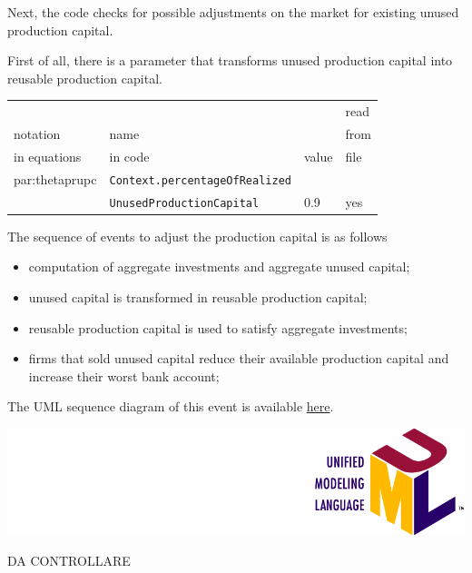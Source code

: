 \documentclass{book}
\newcommand{\doclocation}{file:///Users/giulioni/Documents/workspace/gabriele/docs}
\begin{document}

\vskip3mm
Next, the code checks for possible adjustments on the market for existing unused production capital.

First of all, there is a parameter that transforms unused production capital into reusable production capital.

\vskip3mm
\noindent
\begin{tabular}{l l l l}
	\hline
	& &&read\\
	notation& name &&from\\
	in equations& in code&value&file\\
	\hline
	\hline
	\gls{par:thetaprupc}&\verb+Context.percentageOfRealized+&&\\
	&\hskip2cm \verb+UnusedProductionCapital+&0.9&yes\\
	\hline
\end{tabular}

\vskip3mm

The sequence of events to adjust the production capital is as follows
\begin{itemize}
	\item computation of aggregate investments and aggregate unused capital;
	\item unused capital is transformed in reusable production capital;
	\item reusable production capital is used to satisfy aggregate investments;
	\item firms that sold unused capital reduce their available production capital and increase their worst bank account;
\end{itemize}

\vskip3mm
The UML sequence diagram of this event is available \href{\doclocation/umldoc/computeInvestments.html}{here}.
\begin{marginfigure}
	\includegraphics[scale=0.1]{uml.png}
\end{marginfigure}
\vskip3mm

\iffalse

DA CONTROLLARE
\end{document}
